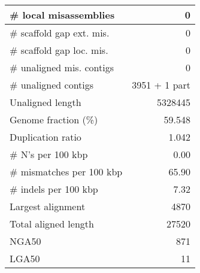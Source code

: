 \documentclass[12pt,a4paper]{article}
\begin{document}
\begin{table}[ht]
\begin{center}
\begin{tabular}{|l*{1}{|r}|}
\# local misassemblies & 0 \\ \hline
\# scaffold gap ext. mis. & 0 \\ \hline
\# scaffold gap loc. mis. & 0 \\ \hline
\# unaligned mis. contigs & 0 \\ \hline
\# unaligned contigs & 3951 + 1 part \\ \hline
Unaligned length & 5328445 \\ \hline
Genome fraction (\%) & 59.548 \\ \hline
Duplication ratio & 1.042 \\ \hline
\# N's per 100 kbp & 0.00 \\ \hline
\# mismatches per 100 kbp & 65.90 \\ \hline
\# indels per 100 kbp & 7.32 \\ \hline
Largest alignment & 4870 \\ \hline
Total aligned length & 27520 \\ \hline
NGA50 & 871 \\ \hline
LGA50 & 11 \\ \hline
\end{tabular}
\end{center}
\end{table}
\end{document}
